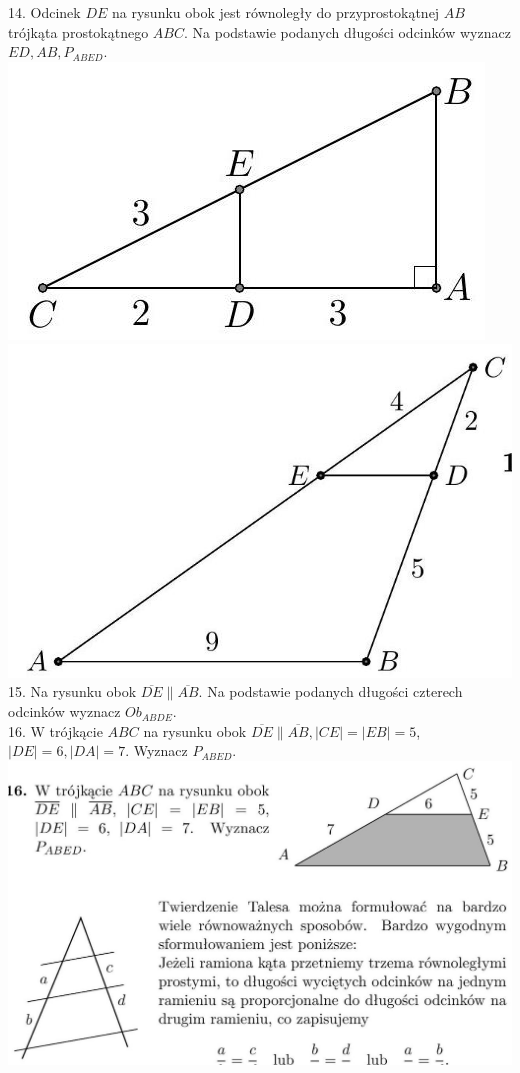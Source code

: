 \documentclass[10pt]{article}
\begin{document}
14. Odcinek \(D E\) na rysunku obok jest równoległy do przyprostokątnej \(A B\) trójkąta prostokątnego \(A B C\). Na podstawie podanych długości odcinków wyznacz \(E D, A B, P_{A B E D}\).\\
\includegraphics[max width=\textwidth, center]{2024_11_21_e9b4faa005d5be2cc318g-010}\\
\includegraphics[max width=\textwidth, center]{2024_11_21_e9b4faa005d5be2cc318g-011}\\
15. Na rysunku obok \(\overline{D E} \| \overline{A B}\). Na podstawie podanych długości czterech odcinków wyznacz \(O b_{A B D E}\).\\
16. W trójkącie \(A B C\) na rysunku obok \(\overline{D E} \| \overline{A B},|C E|=|E B|=5\), \(|D E|=6,|D A|=7\). Wyznacz \(P_{A B E D}\).\\
\includegraphics[max width=\textwidth, center]{2024_11_21_e9b4faa005d5be2cc318g-011(2)}
\end{document}
